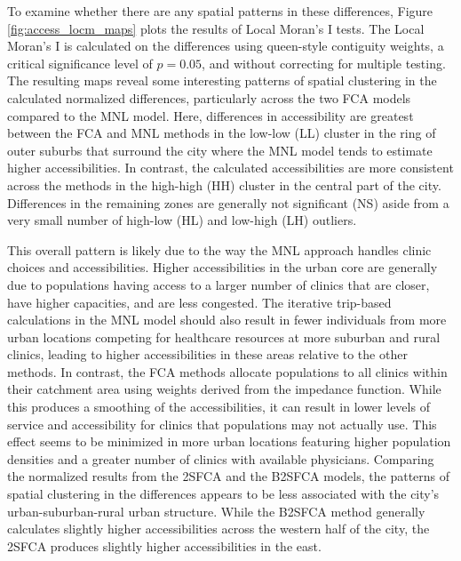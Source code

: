 \documentclass[]{elsarticle} %
\begin{document}
To examine whether there are any spatial patterns in these differences,
Figure \ref{fig:access_locm_maps} plots the results of Local Moran's I
tests. The Local Moran's I is calculated on the differences using
queen-style contiguity weights, a critical significance level of
\(p=0.05\), and without correcting for multiple testing. The resulting
maps reveal some interesting patterns of spatial clustering in the
calculated normalized differences, particularly across the two FCA
models compared to the MNL model. Here, differences in accessibility are
greatest between the FCA and MNL methods in the low-low (LL) cluster in
the ring of outer suburbs that surround the city where the MNL model
tends to estimate higher accessibilities. In contrast, the calculated
accessibilities are more consistent across the methods in the high-high
(HH) cluster in the central part of the city. Differences in the
remaining zones are generally not significant (NS) aside from a very
small number of high-low (HL) and low-high (LH) outliers.

This overall pattern is likely due to the way the MNL approach handles
clinic choices and accessibilities. Higher accessibilities in the urban
core are generally due to populations having access to a larger number
of clinics that are closer, have higher capacities, and are less
congested. The iterative trip-based calculations in the MNL model should
also result in fewer individuals from more urban locations competing for
healthcare resources at more suburban and rural clinics, leading to
higher accessibilities in these areas relative to the other methods. In
contrast, the FCA methods allocate populations to all clinics within
their catchment area using weights derived from the impedance function.
While this produces a smoothing of the accessibilities, it can result in
lower levels of service and accessibility for clinics that populations
may not actually use. This effect seems to be minimized in more urban
locations featuring higher population densities and a greater number of
clinics with available physicians. Comparing the normalized results from
the 2SFCA and the B2SFCA models, the patterns of spatial clustering in
the differences appears to be less associated with the city's
urban-suburban-rural urban structure. While the B2SFCA method generally
calculates slightly higher accessibilities across the western half of
the city, the 2SFCA produces slightly higher accessibilities in the
east.
\end{document}
